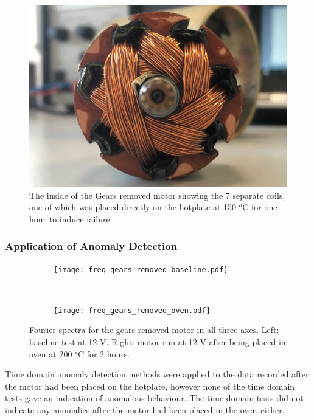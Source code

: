 \begin{figure}[t]
    \includegraphics[width=1.0\textwidth]{fig/Gears_Removed_Inside.JPG}
    \caption[Inside Workings of Motor D]{The inside of the Gears removed motor showing the 7 separate coils, one of which was placed directly on the hotplate at 150 $^o$C for one hour to induce failure.}
    \label{fig:hotplate_motor}
\end{figure}


\subsubsection{Application of Anomaly Detection}

\begin{figure}[t!]
    \centering
    \begin{subfigure}[t]{0.5\textwidth}
        \centering
        \texttt{[image: freq\_gears\_removed\_baseline.pdf]}
    \end{subfigure}%
    ~ 
    \begin{subfigure}[t]{0.5\textwidth}
        \centering
        \texttt{[image: freq\_gears\_removed\_oven.pdf]}
    \end{subfigure}
    \caption[Fourier Plot Overheating]{Fourier spectra for the gears removed motor in all three axes. Left: baseline test at 12 V. Right: motor run at 12 V after being placed in oven at 200 $^{\circ}$C for 2 hours.}
    \label{fig:overheating_fourier}
\end{figure}

Time domain anomaly detection methods were applied to the data recorded after the motor had been placed on the hotplate, however none of the time domain tests gave an indication of anomalous behaviour. The time domain tests did not indicate any anomalies after the motor had been placed in the over, either. 

